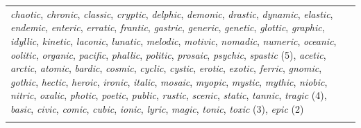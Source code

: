 \begin{table}
\begin{tabularx}{\textwidth}{Q}
\textit{chaotic}, \textit{chronic}, \textit{classic}, \textit{cryptic}, \textit{delphic}, \textit{demonic}, \textit{drastic}, \textit{dynamic}, \textit{elastic}, \textit{endemic}, \textit{enteric}, \textit{erratic}, \textit{frantic}, \textit{gastric}, \textit{generic}, \textit{genetic}, \textit{glottic}, \textit{graphic}, \textit{idyllic}, \textit{kinetic}, \textit{laconic}, \textit{lunatic}, \textit{melodic}, \textit{motivic}, \textit{nomadic}, \textit{numeric}, \textit{oceanic}, \textit{oolitic}, \textit{organic}, \textit{pacific}, \textit{phallic}, \textit{politic}, \textit{prosaic}, \textit{psychic}, \textit{spastic} (5), \textit{acetic}, \textit{arctic}, \textit{atomic}, \textit{bardic}, \textit{cosmic}, \textit{cyclic}, \textit{cystic}, \textit{erotic}, \textit{exotic}, \textit{ferric}, \textit{gnomic}, \textit{gothic}, \textit{hectic}, \textit{heroic}, \textit{ironic}, \textit{italic}, \textit{mosaic}, \textit{myopic}, \textit{mystic}, \textit{mythic}, \textit{niobic}, \textit{nitric}, \textit{oxalic}, \textit{photic}, \textit{poetic}, \textit{public}, \textit{rustic}, \textit{scenic}, \textit{static}, \textit{tannic}, \textit{tragic} (4), \textit{basic}, \textit{civic}, \textit{comic}, \textit{cubic}, \textit{ionic}, \textit{lyric}, \textit{magic}, \textit{tonic}, \textit{toxic} (3), \textit{epic} (2)\\
\lspbottomrule
\end{tabularx}
\end{table}


